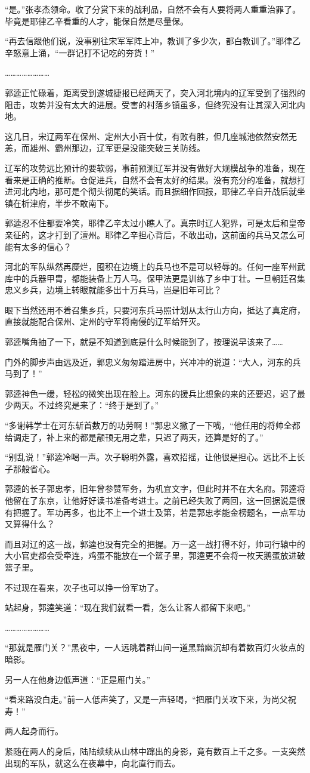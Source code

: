 “是。”张孝杰领命。收了分赏下来的战利品，自然不会有人要将两人重重治罪了。毕竟是耶律乙辛看重的人才，能保自然是尽量保。

“再去信跟他们说，没事别往宋军军阵上冲，教训了多少次，都白教训了。”耶律乙辛怒意上涌，“一群记打不记吃的夯货！”

……………………

郭逵正忙碌着，距离受到遂城捷报已经两天了，突入河北境内的辽军受到了强烈的阻击，攻势并没有太大的进展。受害的村落乡镇虽多，但终究没有让其深入河北内地。

这几日，宋辽两军在保州、定州大小百十仗，有败有胜，但几座城池依然安然无恙，而雄州、霸州那边，辽军更是没能突破三关防线。

辽军的攻势远比预计的要软弱，事前预测辽军并没有做好大规模战争的准备，现在看来是正确的推断。仓促进兵，自然不会有太好的结果。没有充分的准备，就想打进河北内地，那可是个彻头彻尾的笑话。而且据细作回报，耶律乙辛自开战后就坐镇在析津府，半步不敢南下。

郭逵忍不住都要冷笑，耶律乙辛太过小瞧人了。真宗时辽人犯界，可是太后和皇帝亲征的，这才打到了澶州。耶律乙辛担心背后，不敢出动，这前面的兵马又怎么可能有太多的信心？

河北的军队纵然再糜烂，囤积在边境上的兵马也不是可以轻辱的。任何一座军州武库中的兵器甲胄，都能装备上万人马。保甲法更是训练了乡中丁壮。一旦朝廷召集忠义乡兵，边境上转眼就能多出十万兵马，岂是旧年可比？

眼下当然还用不着召集乡兵，只要河东兵马照计划从太行山方向，抵达了真定府，直接就能配合保州、定州的守军将南侵的辽军给歼灭。

郭逵嘴角抽了一下，就是不知道到底是什么时候能到了，按理说早该来了……

门外的脚步声由远及近，郭忠义匆匆踏进房中，兴冲冲的说道：“大人，河东的兵马到了！”

郭逵神色一缓，轻松的微笑出现在脸上。河东的援兵比想象的来的还要迟，迟了最少两天。不过终究是来了：“终于是到了。”

“多谢韩学士在河东斩首数万的功劳啊！”郭忠义撇了一下嘴，“他任用的将帅全都给调走了，补上来的都是颟顸无用之辈，只迟了两天，还算是好的了。”

“别乱说！”郭逵冷喝一声。次子聪明外露，喜欢招摇，让他很是担心。远比不上长子那般省心。

郭逵的长子郭忠孝，旧年曾参赞军务，为机宜文字，但此时并不在大名府。郭逵将他留在了东京，让他好好读书准备考进士。之前已经失败了两回，这一回据说是很有把握了。军功再多，也比不上一个进士及第，若是郭忠孝能金榜题名，一点军功又算得什么？

而且对辽的这一战，郭逵也没有完全的把握。万一这一战打得不好，帅司行辕中的大小官吏都会受牵连，鸡蛋不能放在一个篮子里，郭逵更不会将一枚天鹅蛋放进破篮子里。

不过现在看来，次子也可以挣一份军功了。

站起身，郭逵笑道：“现在我们就看一看，怎么让客人都留下来吧。”

……………………

“那就是雁门关？”黑夜中，一人远眺着群山间一道黑黯幽沉却有着数百灯火妆点的暗影。

另一人在他身边低声道：“正是雁门关。”

“看来路没白走。”前一人低声笑了，又是一声轻喝，“把雁门关攻下来，为尚父祝寿！”

两人起身而行。

紧随在两人的身后，陆陆续续从山林中蹿出的身影，竟有数百上千之多。一支突然出现的军队，就这么在夜幕中，向北直行而去。
